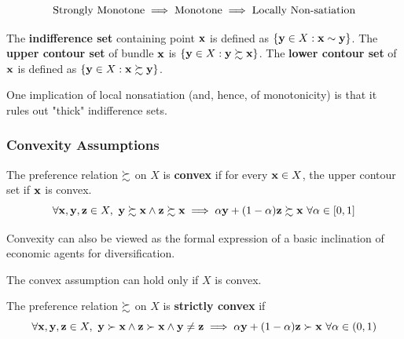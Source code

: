 \documentclass{article}
\begin{document}
 			\begin{proposition}[Exercise 3.B.1]
 				\begin{equation}
 					\text{{Strongly Monotone}} \implies \text{{Monotone}} \implies \text{{Locally Non-satiation}}
 				\end{equation}
 			\end{proposition}
 			
 			\begin{definition}
 				The \textbf{indifference set} containing point $\textbf{x}$ is defined as $\{\textbf{y} \in X: \textbf{x} \sim \textbf{y} \}$. The \textbf{upper contour set} of bundle $\textbf{x}$ is $\{\textbf{y} \in X: \textbf{y} \succsim \textbf{x}\}$. The \textbf{lower contour set} of $\textbf{x}$ is defined as $\{\textbf{y} \in X: \textbf{x} \succsim \textbf{y}\}$.
 			\end{definition}
 			
 			\begin{remark}
 				One implication of local nonsatiation (and, hence, of monotonicity) is that it rules out "thick" indifference sets.
 			\end{remark}
 			
 			\subsubsection{Convexity Assumptions}
 			
 			\begin{definition}[3.B.4]
 				The preference relation $\succsim$ on $X$ is \textbf{convex} if for every $\textbf{x} \in X$, the upper contour set if $\textbf{x}$ is convex.
 				\begin{equation}
 					\forall \vex, \vey, \vez \in X,\ \vey \pref \vex \land \vez \pref \vex \implies \alpha \vey + (1-\alpha) \vez \pref \vex\ \forall \alpha \in [0, 1]
 				\end{equation}
 			\end{definition}
 			
 			\begin{remark}
 				Convexity can also be viewed as the formal expression of a basic inclination of economic agents for diversification.
 			\end{remark}
 			
 			\begin{remark}
 				The convex assumption can hold only if $X$ is convex.
 			\end{remark}
 			
 			\begin{definition}[3.B.5]
 				The preference relation $\succsim$ on $X$ is \textbf{strictly convex} if
 				\begin{equation}
 					\forall \textbf{x}, \textbf{y}, \textbf{z} \in X,\ \textbf{y} \succ \textbf{x} \land \textbf{z} \succ \textbf{x} \land \textbf{y} \neq \textbf{z} \implies \alpha \textbf{y} + (1-\alpha) \textbf{z} \succ \textbf{x}\ \forall \alpha \in (0, 1)
 				\end{equation}
 			\end{definition}
 			
\end{document}

